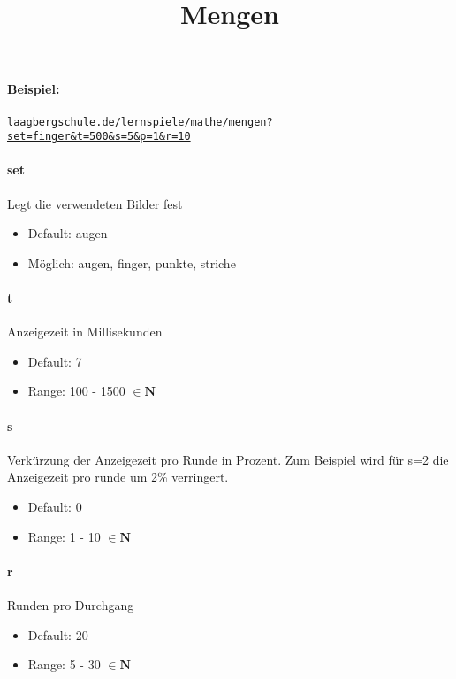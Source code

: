 \documentclass[]{article}
\title{Mengen}
\begin{document}
\maketitle

\paragraph{Beispiel:}
\texttt{\href{laagbergschule.de/lernspiele/mathe/mengen?set=finger\&t=500\&s=5\&p=1\&r=10}{laagbergschule.de/lernspiele/mathe/mengen?set=finger\&t=500\&s=5\&p=1\&r=10}} \\
\begin{multicols}{2}

	\paragraph{set}  Legt die verwendeten Bilder fest
	\begin{itemize}
		\item Default: augen
		\item Möglich: augen, finger, punkte, striche
	\end{itemize}

	\paragraph{t} Anzeigezeit in Millisekunden

	\begin{itemize}
		\item Default: 7
		\item Range: 100 - 1500 $\in \mathbf{N}$
	\end{itemize}

	\paragraph{s} Verkürzung der Anzeigezeit pro Runde in Prozent. Zum Beispiel wird für s=2 die Anzeigezeit pro runde um 2\% verringert.
	\begin{itemize}
		\item Default: 0
		\item Range: 1 - 10 $\in \mathbf{N}$
	\end{itemize}

	\paragraph{r}  Runden pro Durchgang
	\begin{itemize}
		\item Default: 20
		\item Range: 5 - 30 $\in \mathbf{N}$
	\end{itemize}


\end{multicols}
\end{document}
